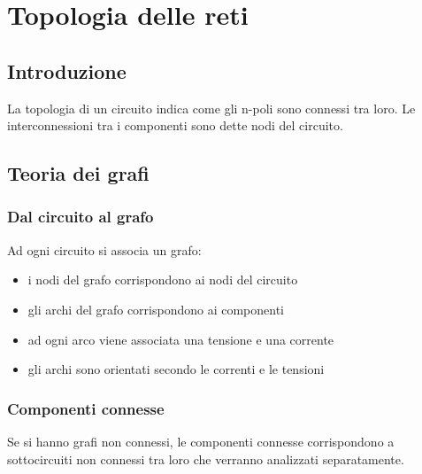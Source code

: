 \documentclass[a4paper]{article}
\begin{document}
\newpage

\section{Topologia delle reti}
\subsection{Introduzione}
La topologia di un circuito indica come gli n-poli sono connessi tra loro. Le interconnessioni tra i componenti sono dette
nodi del circuito.

\subsection{Teoria dei grafi}
\subsubsection*{Dal circuito al grafo}
Ad ogni circuito si associa un grafo:
\begin{itemize}
	\item i nodi del grafo corrispondono ai nodi del circuito
	\item gli archi del grafo corrispondono ai componenti
	\item ad ogni arco viene associata una tensione e una corrente
	\item gli archi sono orientati secondo le correnti e le tensioni
\end{itemize}

\subsubsection*{Componenti connesse}
Se si hanno grafi non connessi, le componenti connesse corrispondono a sottocircuiti non connessi tra loro che verranno
analizzati separatamente.
\end{document}
